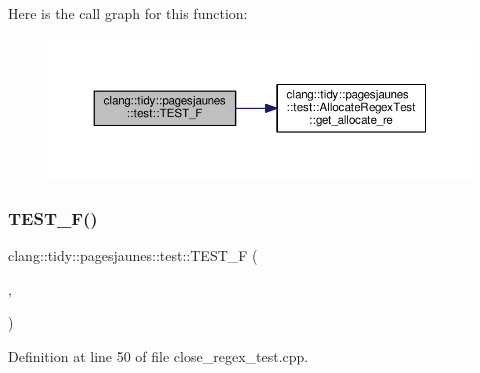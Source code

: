Here is the call graph for this function\+:
\nopagebreak
\begin{figure}[H]
\begin{center}
\leavevmode
\includegraphics[width=350pt]{namespaceclang_1_1tidy_1_1pagesjaunes_1_1test_af7271fc9b6addd32cbf165dc1d586bcc_cgraph}
\end{center}
\end{figure}
\mbox{\label{namespaceclang_1_1tidy_1_1pagesjaunes_1_1test_a3a179a59e8986cfb08283b691a6ce4d6}} 
\subsubsection{\texorpdfstring{T\+E\+S\+T\+\_\+\+F()}{TEST\_F()}\hspace{0.1cm}{\footnotesize\ttfamily [2/57]}}
{\footnotesize\ttfamily clang\+::tidy\+::pagesjaunes\+::test\+::\+T\+E\+S\+T\+\_\+F (\begin{DoxyParamCaption}\item[{\hyperlink{classclang_1_1tidy_1_1pagesjaunes_1_1test_1_1_close_regex_test}{Close\+Regex\+Test}}]{,  }\item[{Regex\+Matching\+Indicators}]{ }\end{DoxyParamCaption})}



Definition at line 50 of file close\+\_\+regex\+\_\+test.\+cpp.

